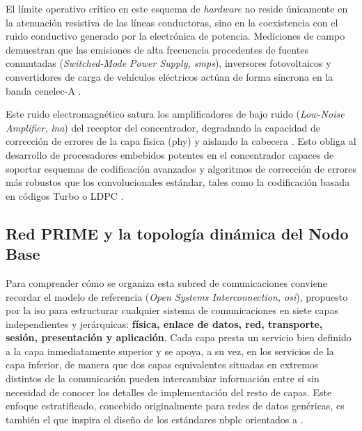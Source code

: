 El límite operativo crítico en este esquema de \textit{hardware} no reside únicamente en la atenuación resistiva de las líneas conductoras, sino en la coexistencia con el ruido conductivo generado por la electrónica de potencia. Mediciones de campo demuestran que las emisiones de alta frecuencia procedentes de fuentes conmutadas (\textit{Switched-Mode Power Supply, \gls{smps}}), inversores fotovoltaicos y convertidores de carga de vehículos eléctricos actúan de forma síncrona en la banda \gls{cenelec}-A \cite{10104173}. 

Este ruido electromagnético satura los amplificadores de bajo ruido (\textit{Low-Noise Amplifier, \gls{lna}}) del receptor del concentrador, degradando la capacidad de corrección de errores de la capa física (\gls{phy}) y aislando la cabecera \cite{10104173}. Esto obliga al desarrollo de procesadores embebidos potentes en el concentrador capaces de soportar esquemas de codificación avanzados y algoritmos de corrección de errores más robustos que los convolucionales estándar, tales como la codificación basada en códigos Turbo o LDPC \cite{9441595, 9820886}.

\subsection{Red PRIME y la topología dinámica del Nodo Base}
\label{subsec:estructura_PRIME}

Para comprender cómo se organiza esta subred de comunicaciones conviene recordar el modelo de referencia (\textit{Open Systems Interconnection, \gls{osi}}), propuesto por la \gls{iso} para estructurar cualquier sistema de comunicaciones en siete capas independientes y jerárquicas: \textbf{física, enlace de datos, red, transporte, sesión, presentación y aplicación}. Cada capa presta un servicio bien definido a la capa inmediatamente superior y se apoya, a su vez, en los servicios de la capa inferior, de manera que dos capas equivalentes situadas en extremos distintos de la comunicación pueden intercambiar información entre sí sin necesidad de conocer los detalles de implementación del resto de capas. Este enfoque estratificado, concebido originalmente para redes de datos genéricas, es también el que inspira el diseño de los estándares \gls{nbplc} orientados a .


